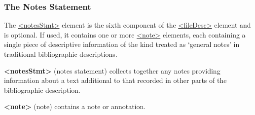 \subsubsection[{The Notes Statement}]{The Notes Statement}\label{HD27}\par
The \hyperref[TEI.notesStmt]{<notesStmt>} element is the sixth component of the \hyperref[TEI.fileDesc]{<fileDesc>} element and is optional. If used, it contains one or more \hyperref[TEI.note]{<note>} elements, each containing a single piece of descriptive information of the kind treated as ‘general notes’ in traditional bibliographic descriptions. 
\begin{sansreflist}
  
\item [\textbf{<notesStmt>}] (notes statement) collects together any notes providing information about a text additional to that recorded in other parts of the bibliographic description.
\item [\textbf{<note>}] (note) contains a note or annotation.
\end{sansreflist}
\par
